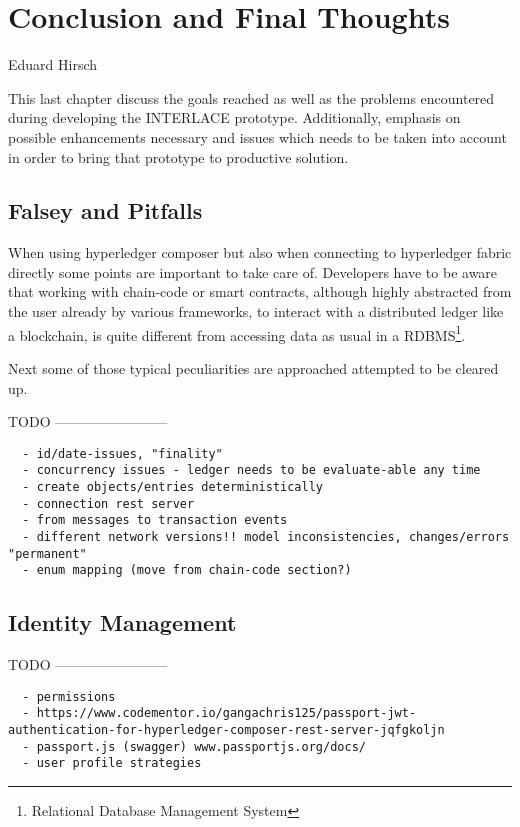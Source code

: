 \chapter{Conclusion and Final Thoughts}
\label{ch:conclusion}

\vspace{-1cm}
\begin{center}
Eduard Hirsch
\end{center}

This last chapter discuss the goals reached as well as the problems encountered during developing the INTERLACE prototype. Additionally, emphasis on possible enhancements necessary and issues which needs to be taken into account in order to bring that prototype to productive solution.

\section{Falsey and Pitfalls}

When using hyperledger composer but also when connecting to hyperledger fabric directly some points are important to take care of. Developers have to be aware that working with chain-code or smart contracts, although highly abstracted from the user already by various frameworks, to interact with a distributed ledger like a blockchain, is quite different from accessing data as usual in a RDBMS\footnote{Relational Database Management System}.

Next some of those typical peculiarities are approached attempted to be cleared up.

TODO ------------------------

\begin{verbatim}
  - id/date-issues, "finality"
  - concurrency issues - ledger needs to be evaluate-able any time
  - create objects/entries deterministically
  - connection rest server
  - from messages to transaction events
  - different network versions!! model inconsistencies, changes/errors "permanent"
  - enum mapping (move from chain-code section?)
\end{verbatim}

\section{Identity Management}
\label{sec:id-management}

TODO ------------------------

\begin{verbatim}
  - permissions
  - https://www.codementor.io/gangachris125/passport-jwt-authentication-for-hyperledger-composer-rest-server-jqfgkoljn
  - passport.js (swagger) www.passportjs.org/docs/
  - user profile strategies
\end{verbatim}

